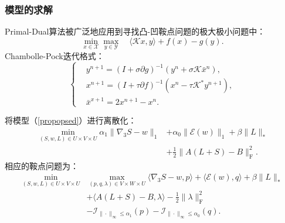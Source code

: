 \documentclass{beamer}
\begin{document}
\begin{frame}
\frametitle{模型的求解}
Primal-Dual算法被广泛地应用到寻找凸-凹鞍点问题的极大极小问题中：
\begin{equation}
\min_{x\in\mathcal{X}}\max_{y\in\mathcal{Y}}\quad\langle \mathcal{K}x,y\rangle+f(x)-g(y).
\label{saddle}
\end{equation}
Chambolle-Pock迭代格式：
\begin{equation*}
\left\{
\begin{aligned}
&y^{n+1}=(I+\sigma\partial g)^{-1}(y^n+\sigma \mathcal{K}\bar{x}^n), \\
&x^{n+1}=(I+\tau\partial f)^{-1}(x^n-\tau \mathcal{K}^*y^{n+1}), \\
&\bar{x}^{x+1}=2x^{n+1}-x^n.
\end{aligned}
\right.
\end{equation*}
\end{frame}

\begin{frame}
将模型（\ref{propopsed}）进行离散化：
\begin{equation}
\begin{aligned}
	\min_{(S,w,L)\in U\times V\times U} \alpha_1 \|\nabla_3 S-w\|_1&+\alpha_0\|\mathcal{E}(w)\|_1+\beta\|L\|_*\\
	&+\frac{1}{2}\|A(L+S)-B\|_\mathrm{F}^2.
\end{aligned}
\label{discrete}
\end{equation}
相应的鞍点问题为：
\begin{equation}
\begin{aligned}
	\min_{(S,w,L)\in U\times V\times U} &\max_{(p,q,\lambda)\in V\times W\times U} \langle \nabla_3 S-w,p\rangle+\langle\mathcal{E}(w),q\rangle+\beta\|L\|_* \\
	&+\langle A(L+S)-B,\lambda \rangle-\frac{1}{2}\|\lambda\|_\mathrm{F}^2 \\
	&-\mathcal{I}_{\|\cdot\|_\infty\leq\alpha_1}(p)-\mathcal{I}_{\|\cdot\|_\infty\leq\alpha_0}(q).
\end{aligned}
\label{dual}
\end{equation}
\end{frame}
\end{document}

